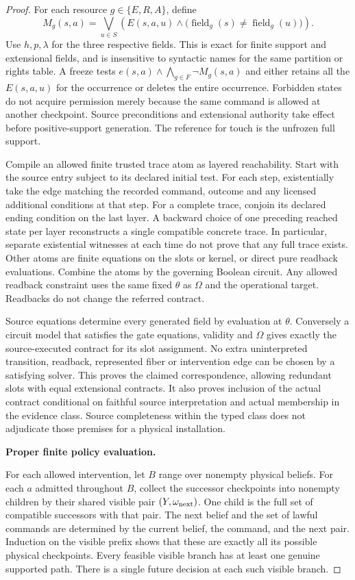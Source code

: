 \begin{proof}
For each resource \(g\in\{E,R,A\}\), define
\[
 M_g(s,a)=\bigvee_{u\in S}\left(E(s,a,u)\land
       \big(\operatorname{field}_g(s)\ne\operatorname{field}_g(u)\big)\right).
\]
Use \(h,p,\lambda\) for the three respective fields. This is exact for finite support and extensional fields, and is insensitive to syntactic names for the same partition or rights table. A freeze tests \(e(s,a)\land\bigwedge_{g\in F}\neg M_g(s,a)\) and either retains all the \(E(s,a,u)\) for the occurrence or deletes the entire occurrence. Forbidden states do not acquire permission merely because the same command is allowed at another checkpoint. Source preconditions and extensional authority take effect before positive-support generation. The reference for touch is the unfrozen full support.

Compile an allowed finite trusted trace atom as layered reachability. Start with the source entry subject to its declared initial test. For each step, existentially take the edge matching the recorded command, outcome and any licensed additional conditions at that step. For a complete trace, conjoin its declared ending condition on the last layer. A backward choice of one preceding reached state per layer reconstructs a single compatible concrete trace. In particular, separate existential witnesses at each time do not prove that any full trace exists. Other atoms are finite equations on the slots or kernel, or direct pure readback evaluations. Combine the atoms by the governing Boolean circuit. Any allowed readback constraint uses the same fixed \(\theta\) as \(\Omega\) and the operational target. Readbacks do not change the referred contract.

Source equations determine every generated field by evaluation at \(\theta\). Conversely a circuit model that satisfies the gate equations, validity and \(\Omega\) gives exactly the source-executed contract for its slot assignment. No extra uninterpreted transition, readback, represented fiber or intervention edge can be chosen by a satisfying solver. This proves the claimed correspondence, allowing redundant slots with equal extensional contracts. It also proves inclusion of the actual contract conditional on faithful source interpretation and actual membership in the evidence class. Source completeness within the typed class does not adjudicate those premises for a physical installation.

\textbf{Proper finite policy evaluation.}

For each allowed intervention, let \(B\) range over nonempty physical beliefs. For each \(a\) admitted throughout \(B\), collect the successor checkpoints into nonempty children by their shared visible pair \((Y,\omega_{\rm next})\). One child is the full set of compatible successors with that pair. The next belief and the set of lawful commands are determined by the current belief, the command, and the next pair. Induction on the visible prefix shows that these are exactly all its possible physical checkpoints. Every feasible visible branch has at least one genuine supported path. There is a single future decision at each such visible branch.


\end{proof}
